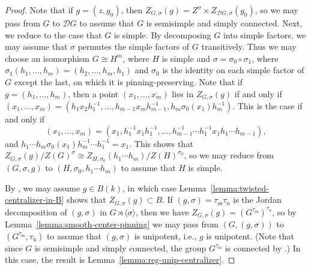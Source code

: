 \documentclass[11pt,reqno]{amsart}
\theoremstyle{definition}
\renewcommand{\rm}{\mathrm}
\newcommand{\sD}{{\mathscr D}}
\begin{document}
\begin{proof}
    Note that if $g = (z, g_0)$, then $Z_{G,\sigma}(g) = Z^\sigma \times Z_{\sD G,\sigma}(g_0)$, so we may pass from $G$ to $\sD G$ to assume that $G$ is semisimple and simply connected. Next, we reduce to the case that $G$ is simple. By decomposing $G$ into simple factors, we may assume that $\sigma$ permutes the simple factors of $G$ transitively. Thus we may choose an isomorphism $G \cong H^m$, where $H$ is simple and $\sigma = \sigma_0 \circ \sigma_1$, where $\sigma_1(h_1, \dots, h_m) = (h_2, \dots, h_m, h_1)$ and $\sigma_0$ is the identity on each simple factor of $G$ except the last, on which it is pinning-preserving. Note that if $g = (h_1, \dots, h_m)$, then a point $(x_1, \dots, x_m)$ lies in $Z_{G,\sigma}(g)$ if and only if $(x_1, \dots, x_m) = (h_1x_2h_1^{-1}, \dots, h_{m-1}x_mh_{m-1}^{-1}, h_m\sigma_0(x_1)h_m^{-1})$. This is the case if and only if
    \[
    (x_1, \dots, x_m) = (x_1, h_1^{-1}x_1h_1^{-1}, \dots, h_{m-1}^{-1} \cdots h_1^{-1}x_1h_1 \cdots h_{m-1}),
    \]
    and $h_1 \cdots h_m \sigma_0(x_1) h_m^{-1} \cdots h_1^{-1} = x_1$. This shows that $Z_{G,\sigma}(g)/Z(G)^\sigma \cong Z_{H,\sigma_0}(h_1 \cdots h_m)/Z(H)^{\sigma_0}$, so we may reduce from $(G, \sigma, g)$ to $(H, \sigma_0, h_1 \cdots h_m)$ to assume that $H$ is simple.

    By \cite[Lemma 5(i)]{Springer-twisted}, we may assume $g \in B(k)$, in which case Lemma~\ref{lemma:twisted-centralizer-in-B} shows that $Z_{G,\sigma}(g) \subset B$. If $(g,\sigma) = \tau_{\rm{ss}} \tau_{\rm{u}}$ is the Jordan decomposition of $(g,\sigma)$ in $G \rtimes \langle\sigma\rangle$, then we have $Z_{G,\sigma}(g) = (G^{\tau_{\rm{ss}}})^{\tau_{\rm{u}}}$, so by Lemma~\ref{lemma:smooth-center-pinning} we may pass from $(G, (g,\sigma))$ to $(G^{\tau_{\rm{ss}}}, \tau_{\rm{u}})$ to assume that $(g,\sigma)$ is unipotent, i.e., $g$ is unipotent. (Note that since $G$ is semisimple and simply connected, the group $G^{\tau_{\rm{ss}}}$ is connected by \cite[Theorem 8.1]{SteinbergEndomorphisms}.) In this case, the result is Lemma~\ref{lemma:reg-unip-centralizer}.
\end{proof}
\end{document}
